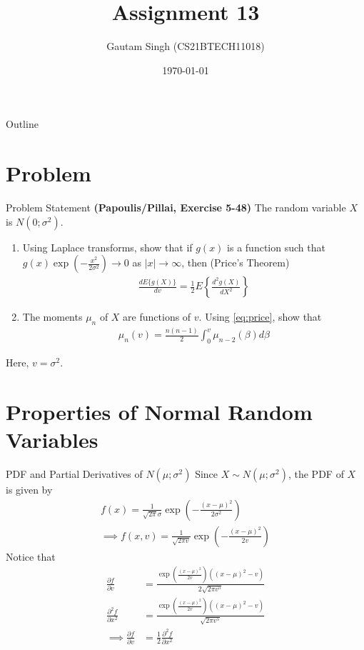 \documentclass{beamer}
\title{Assignment 13}
\author{Gautam Singh (CS21BTECH11018)}
\date{\today}
\begin{document}
\begin{frame}
    \titlepage 
\end{frame}

\begin{frame}{Outline}
    \tableofcontents
\end{frame}

\section{Problem}
\begin{frame}{Problem Statement}
	\textbf{(Papoulis/Pillai, Exercise 5-48)} The random variable $X$ is $N(0; \sigma^2)$.
	\begin{enumerate}
		\item Using Laplace transforms, show that if $g(x)$ is a function such that $g(x)\exp{(-\frac{x^2}{2\sigma^2})} \to 0$ as $|x| \to \infty$, then (Price's Theorem)
			\begin{align}
				\frac{dE\{g(X)\}}{dv} = \frac{1}{2}E\left\{\frac{d^2g(X)}{dX^2}\right\} 
				\label{eq:price}
			\end{align}
		\item The moments $\mu_n$ of $X$ are functions of $v$. Using \eqref{eq:price}, show that
			\begin{align}
				\mu_n(v) = \frac{n(n - 1)}{2}\int_{0}^{v}\mu_{n - 2}(\beta)d\beta
				\label{eq:moments}
			\end{align}
	\end{enumerate}
	Here, $v = \sigma^2$.
\end{frame}

\section{Properties of Normal Random Variables}
\begin{frame}{PDF and Partial Derivatives of $N(\mu; \sigma^2)$}
	Since $X \sim N(\mu; \sigma^2)$, the PDF of $X$ is given by
		\begin{align}
			f(x) = \frac{1}{\sqrt{2\pi}\sigma}\exp{\left(-\frac{(x - \mu)^2}{2\sigma^2}\right)} \\
			\implies f(x, v) = \frac{1}{\sqrt{2\pi v}}\exp{\left(-\frac{(x - \mu)^2}{2v}\right)}
			\label{eq:gauss-pdf}
		\end{align}
	Notice that
		\begin{align}
			\frac{\partial f}{\partial v} &= \frac{\exp{\left(\frac{(x - \mu)^2}{2v}\right)}((x - \mu)^2 - v)}{2\sqrt{2\pi v^5}} \\
			\frac{\partial^2 f}{\partial x^2} &= \frac{\exp{\left(\frac{(x - \mu)^2}{2v}\right)}((x - \mu)^2 - v)}{\sqrt{2\pi v^5}} \\
			\implies \frac{\partial f}{\partial v} &= \frac{1}{2}\frac{\partial^2 f}{\partial x^2}
			\label{eq:gauss-derivatives}
		\end{align}
\end{frame}
		
\end{document}
